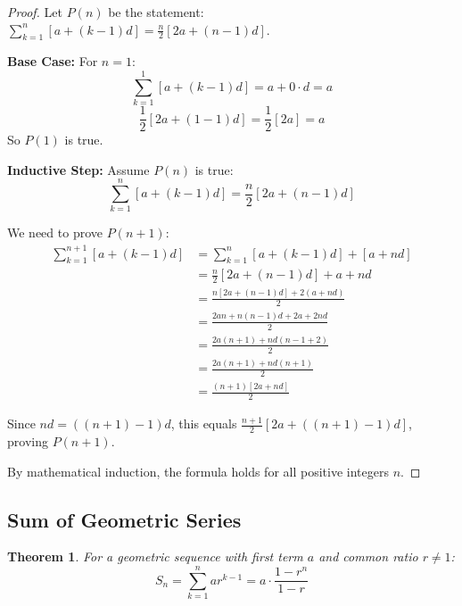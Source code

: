 \documentclass[12pt]{article}
\newtheorem{theorem}{Theorem}
\begin{document}
\begin{proof}
Let $P(n)$ be the statement: $\sum_{k=1}^{n} [a + (k-1)d] = \frac{n}{2}[2a + (n-1)d]$.

\textbf{Base Case:} For $n = 1$:
$$\sum_{k=1}^{1} [a + (k-1)d] = a + 0 \cdot d = a$$
$$\frac{1}{2}[2a + (1-1)d] = \frac{1}{2}[2a] = a$$
So $P(1)$ is true.

\textbf{Inductive Step:} Assume $P(n)$ is true:
$$\sum_{k=1}^{n} [a + (k-1)d] = \frac{n}{2}[2a + (n-1)d]$$

We need to prove $P(n+1)$:
\begin{align}
\sum_{k=1}^{n+1} [a + (k-1)d] &= \sum_{k=1}^{n} [a + (k-1)d] + [a + nd] \\
&= \frac{n}{2}[2a + (n-1)d] + a + nd \\
&= \frac{n[2a + (n-1)d] + 2(a + nd)}{2} \\
&= \frac{2an + n(n-1)d + 2a + 2nd}{2} \\
&= \frac{2a(n+1) + nd(n-1+2)}{2} \\
&= \frac{2a(n+1) + nd(n+1)}{2} \\
&= \frac{(n+1)[2a + nd]}{2}
\end{align}

Since $nd = ((n+1)-1)d$, this equals $\frac{n+1}{2}[2a + ((n+1)-1)d]$, proving $P(n+1)$.

By mathematical induction, the formula holds for all positive integers $n$.
\end{proof}

\subsection{Sum of Geometric Series}

\begin{theorem}
For a geometric sequence with first term $a$ and common ratio $r \neq 1$:
$$S_n = \sum_{k=1}^{n} ar^{k-1} = a \cdot \frac{1-r^n}{1-r}$$
\end{theorem}
\end{document}
